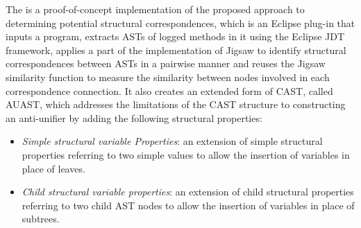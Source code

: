 
The  is a proof-of-concept implementation of the proposed approach to determining potential structural correspondences, which is an Eclipse plug-in that inputs a  program, extracts ASTs of logged methods in it using the Eclipse JDT framework, applies a part of the implementation of Jigsaw to identify structural correspondences between ASTs in a pairwise manner and reuses the Jigsaw similarity function to measure the similarity between nodes involved in each correspondence connection. It also creates an extended form of CAST, called AUAST, which  addresses the limitations of the CAST structure to constructing an anti-unifier by adding the following structural properties:

\begin{itemize} [leftmargin=.5in]
\item \textit{Simple structural variable Properties}: an extension of simple structural properties referring to two simple values to allow the insertion of variables in place of leaves.
\end{itemize}
\begin{itemize} [leftmargin=.5in]
\item \textit{Child structural variable properties}: an extension of child structural properties referring to two child AST nodes to allow the insertion of variables in place of subtrees.
\end{itemize}






